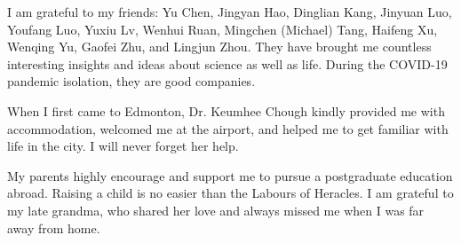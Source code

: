 I am grateful to my friends: Yu Chen, Jingyan Hao, Dinglian Kang, Jinyuan Luo, Youfang Luo, Yuxiu Lv, Wenhui Ruan, Mingchen (Michael) Tang, Haifeng Xu, Wenqing Yu, Gaofei Zhu, and Lingjun Zhou. They have brought me countless interesting insights and ideas about science as well as life. During the COVID-19 pandemic isolation, they are good companies.

When I first came to Edmonton, Dr. Keumhee Chough kindly provided me with accommodation, welcomed me at the airport, and helped me to get familiar with life in the city. I will never forget her help.

My parents highly encourage and support me to pursue a postgraduate education abroad. Raising a child is no easier than the Labours of Heracles. I am grateful to my late grandma, who shared her love and always missed me when I was far away from home.